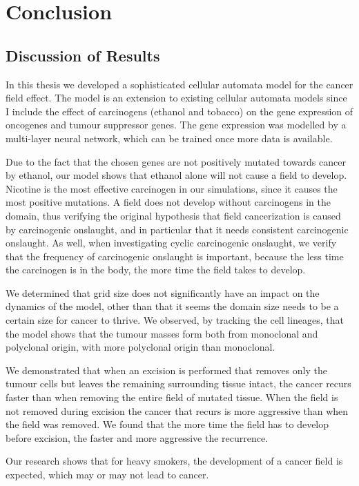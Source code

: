 \documentclass[\main/thesis.tex]{subfiles}
\begin{document}
\chapter{Conclusion}
\section{Discussion of Results}
In this thesis we developed a sophisticated cellular automata model for the cancer field effect. The model is an extension to existing cellular automata models \cite{Gerlee} since I include the effect of carcinogens (ethanol and tobacco) on the gene expression of oncogenes and tumour suppressor genes. The gene expression was modelled by a multi-layer neural network, which can be trained once more data is available.

Due to the fact that the chosen genes are not positively mutated towards cancer by ethanol, our model shows that ethanol alone will not cause a field to develop. Nicotine is the most effective carcinogen in our simulations, since it causes the most positive mutations. A field does not develop without carcinogens in the domain, thus verifying the original hypothesis that field cancerization is caused by carcinogenic onslaught, and in particular that it needs consistent carcinogenic onslaught. As well, when investigating cyclic carcinogenic onslaught, we verify that the frequency of carcinogenic onslaught is important, because the less time the carcinogen is in the body, the more time the field takes to develop. 

We determined that grid size does not significantly have an impact on the dynamics of the model, other than that it seems the domain size needs to be a certain size for cancer to thrive. We observed, by tracking the cell lineages, that the model shows that the tumour masses form both from monoclonal and polyclonal origin, with more polyclonal origin than monoclonal.

We demonstrated that when an excision is performed that removes only the tumour cells but leaves the remaining surrounding tissue intact, the cancer recurs faster than when removing the entire field of mutated tissue. When the field is not removed during excision the cancer that recurs is more aggressive than when the field was removed. We found that the more time the field has to develop before excision, the faster and more aggressive the recurrence. 

Our research shows that for heavy smokers, the development of a cancer field is expected, which may or may not lead to cancer. 
\end{document}
